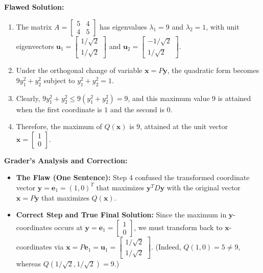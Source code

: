 \documentclass[11pt, letterpaper]{article}
\theoremstyle{definition}
\theoremstyle{remark}
\begin{document}
\textbf{Flawed Solution:}
\begin{enumerate}[label=\arabic*.]
    \item The matrix $A = \begin{bmatrix} 5 & 4 \\ 4 & 5 \end{bmatrix}$ has eigenvalues $\lambda_1 = 9$ and $\lambda_2 = 1$, with unit eigenvectors $\mathbf{u}_1 = \begin{bmatrix} 1/\sqrt{2} \\ 1/\sqrt{2} \end{bmatrix}$ and $\mathbf{u}_2 = \begin{bmatrix} -1/\sqrt{2} \\ 1/\sqrt{2} \end{bmatrix}$.
    \item Under the orthogonal change of variable $\mathbf{x} = P\mathbf{y}$, the quadratic form becomes $9y_1^2 + y_2^2$ subject to $y_1^2 + y_2^2 = 1$.
    \item Clearly, $9y_1^2 + y_2^2 \le 9(y_1^2 + y_2^2) = 9$, and this maximum value $9$ is attained when the first coordinate is $1$ and the second is $0$.
    \item Therefore, the maximum of $Q(\mathbf{x})$ is $9$, attained at the unit vector $\mathbf{x} = \begin{bmatrix} 1 \\ 0 \end{bmatrix}$.
\end{enumerate}

\textbf{Grader's Analysis and Correction:}
\begin{itemize}
    \item \textbf{The Flaw (One Sentence):} Step 4 confused the transformed coordinate vector $\mathbf{y} = \mathbf{e}_1 = (1, 0)^T$ that maximizes $\mathbf{y}^T D \mathbf{y}$ with the original vector $\mathbf{x} = P\mathbf{y}$ that maximizes $Q(\mathbf{x})$.
    \item \textbf{Correct Step and True Final Solution:} Since the maximum in $\mathbf{y}$-coordinates occurs at $\mathbf{y} = \mathbf{e}_1 = \begin{bmatrix} 1 \\ 0 \end{bmatrix}$, we must transform back to $\mathbf{x}$-coordinates via $\mathbf{x} = P\mathbf{e}_1 = \mathbf{u}_1 = \begin{bmatrix} 1/\sqrt{2} \\ 1/\sqrt{2} \end{bmatrix}$. (Indeed, $Q(1,0) = 5 \ne 9$, whereas $Q(1/\sqrt{2}, 1/\sqrt{2}) = 9$.)
\end{itemize}
\end{document}
